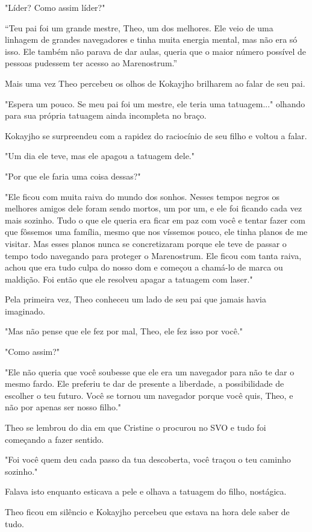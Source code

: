 "Líder? Como assim líder?"

``Teu pai foi um grande mestre, Theo, um dos melhores. Ele veio de uma
linhagem de grandes navegadores e tinha muita energia mental, mas não
era só isso. Ele também não parava de dar aulas, queria que o maior
número possível de pessoas pudessem ter acesso ao Marenostrum.''

Mais uma vez Theo percebeu os olhos de Kokayjho brilharem ao falar de
seu pai.

"Espera um pouco. Se meu pai foi um mestre, ele teria uma tatuagem..."
olhando para sua própria tatuagem ainda incompleta no braço.

Kokayjho se surpreendeu com a rapidez do raciocínio de seu filho e
voltou a falar.

"Um dia ele teve, mas ele apagou a tatuagem dele."

"Por que ele faria uma coisa dessas?"

"Ele ficou com muita raiva do mundo dos sonhos. Nesses tempos negros os
melhores amigos dele foram sendo mortos, um por um, e ele foi ficando
cada vez mais sozinho. Tudo o que ele queria era ficar em paz com você e
tentar fazer com que fôssemos uma família, mesmo que nos víssemos pouco,
ele tinha planos de me visitar. Mas esses planos nunca se concretizaram
porque ele teve de passar o tempo todo navegando para proteger o
Marenostrum. Ele ficou com tanta raiva, achou que era tudo culpa do
nosso dom e começou a chamá-lo de marca ou maldição. Foi então que ele
resolveu apagar a tatuagem com laser."

Pela primeira vez, Theo conheceu um lado de seu pai que jamais havia
imaginado.

"Mas não pense que ele fez por mal, Theo, ele fez isso por você."

"Como assim?"

"Ele não queria que você soubesse que ele era um navegador para não te
dar o mesmo fardo. Ele preferiu te dar de presente a liberdade, a
possibilidade de escolher o teu futuro. Você se tornou um navegador
porque você quis, Theo, e não por apenas ser nosso filho."

Theo se lembrou do dia em que Cristine o procurou no SVO e tudo foi
começando a fazer sentido.

"Foi você quem deu cada passo da tua descoberta, você traçou o teu
caminho sozinho."

Falava isto enquanto esticava a pele e olhava a tatuagem do filho,
nostágica.

Theo ficou em silêncio e Kokayjho percebeu que estava na hora dele saber
de tudo.

